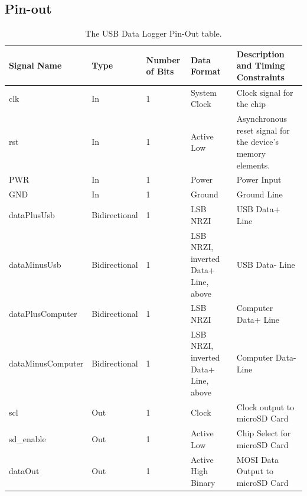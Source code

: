 \documentclass[12pt,letter,oneside]{report}
\begin{document}
\subsection{Pin-out}
\begin{table}[h]
	\caption{The USB Data Logger Pin-Out table.}
	\centering
	\begin{tabular}{| l | l | p{1.5cm} | p{3cm} | p{4cm} |}
		\hline
		\bf{Signal Name} & \bf{Type} & \bf{Number of Bits} & \bf{Data Format} & \bf{Description and Timing Constraints} \\ \hline
		clk              & In        & 1                   & System Clock     & Clock signal for the chip               \\ \hline
		rst              & In        & 1                   & Active Low       & Asynchronous reset signal for the device's memory elements. \\ \hline
		PWR & In & 1 & Power & Power Input \\ \hline
		GND & In & 1 & Ground & Ground Line \\ \hline
		dataPlusUsb & Bidirectional & 1 & LSB NRZI & USB Data+ Line \\ \hline
		dataMinusUsb & Bidirectional & 1 & LSB NRZI, inverted Data+ Line, above & USB Data- Line \\ \hline
		dataPlusComputer & Bidirectional & 1 & LSB NRZI & Computer Data+ Line \\ \hline
		dataMinusComputer & Bidirectional & 1 & LSB NRZI, inverted Data+ Line, above & Computer Data- Line \\ \hline
		scl & Out & 1 & Clock & Clock output to microSD Card \\ \hline
		sd\_enable & Out & 1 & Active Low & Chip Select for microSD Card \\ \hline
		dataOut & Out & 1 & Active High Binary & MOSI Data Output to microSD Card \\ \hline
	\end{tabular}
\end{table}
\pagebreak
\end{document}
